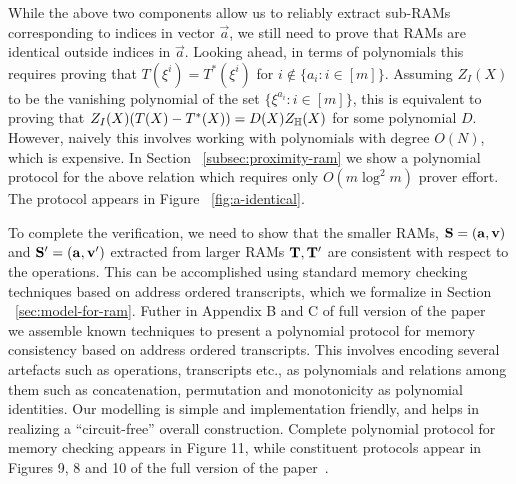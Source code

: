 \medskip

 While the above two components allow us to reliably extract sub-RAMs
corresponding to indices in vector $\vec{a}$, we still need to prove that RAMs are identical outside indices in
$\vec{a}$. Looking ahead, in terms of polynomials this requires proving that $T(\xi^i)=T^*(\xi^i)$ for $i\not\in
\{a_i:i\in [m]\}$. Assuming $Z_I(X)$ to be the vanishing polynomial of the set $\{\xi^{a_i}:i\in [m]\}$,
this is equivalent to proving that $Z_I(X)(T(X) - T^*(X)) = D(X)Z_\mathbb{H}(X)$ for some polynomial $D$. However, naively
this involves working with polynomials with degree $O(N)$, which is expensive.
In Section ~\ref{subsec:proximity-ram} we show a polynomial protocol for the above relation which requires only $O(m\log^2 m)$ prover effort. The protocol
appears in Figure ~\ref{fig:a-identical}.

\medskip

 To complete the verification, we need to show that
the smaller RAMs, $\mathbf{S}=(\mathbf{a},\mathbf{v})$ and $\mathbf{S}'=(\mathbf{a},\mathbf{v}')$ extracted from larger RAMs $\mathbf{T},\mathbf{T}'$
are consistent with respect to the operations. This can be accomplished using standard memory checking techniques
based on address ordered transcripts, which we formalize in Section ~\ref{sec:model-for-ram}. Futher in
Appendix B and C of full version of the paper~\cite{full-ver} %
we assemble known techniques to present
a polynomial protocol for memory consistency based on address ordered transcripts.
This involves encoding several artefacts such as operations, transcripts etc., as polynomials and relations
among them such as concatenation, permutation and monotonicity as polynomial identities. Our modelling is
simple and implementation friendly, and helps in realizing a ``circuit-free'' overall construction. Complete
polynomial protocol for memory checking appears in Figure 11, while constituent protocols appear in Figures 9, 8 and 10 of the full version of the paper~\cite{full-ver}.

\medskip

